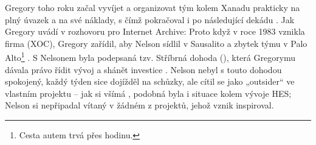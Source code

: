 Gregory toho roku začal vyvíjet a organizovat tým kolem Xanadu prakticky na plný úvazek a na své náklady, s čímž pokračoval i po následující dekádu \autocite[81]{Barnet2014}. Jak Gregory uvádí v rozhovoru pro Internet Archive:  Proto když v roce 1983 vznikla firma  (XOC), Gregory zařídil, aby Nelson sídlil v Sausalito a zbytek týmu v Palo Alto\footnote{Cesta autem trvá přes hodinu.} \autocite{Gregory2010}. S Nelsonem byla podepsaná tzv. Stříbrná dohoda (), která Gregorymu dávala právo řídit vývoj a shánět investice \autocite[81]{Barnet2014}. Nelson nebyl s touto dohodou spokojený, každý týden sice dojížděl na schůzky, ale cítil se jako „outsider“ ve vlastním projektu -- jak si všímá \textcite[81]{Barnet2014}, podobná byla i situace kolem vývoje HES; Nelson si nepřipadal vítaný v žádném z projektů, jehož vznik inspiroval.

